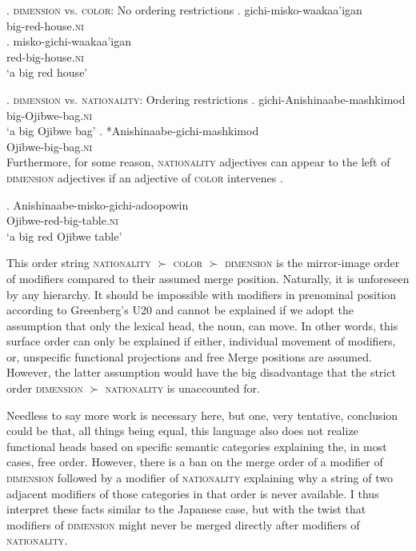 \documentclass [output=book,colorlinks,citecolor=brown]{langscibook}
\begin{document}
\ex. \textsc{dimension} vs. \textsc{color}: No ordering restrictions
\ag. gichi-misko-waakaa’igan\\
big-red-house.\textsc{ni}\\
\bg. misko-gichi-waakaa’igan\\
red-big-house.\textsc{ni}\\
`a big red house’ \null \hfill \citep[161]{rosen:2016:on}

\ex. \textsc{dimension} vs. \textsc{nationality}: Ordering restrictions
\ag. gichi-Anishinaabe-mashkimod\\
big-Ojibwe-bag.\textsc{ni}\\
`a big Ojibwe bag’
\bg. *Anishinaabe-gichi-mashkimod\\
Ojibwe-big-bag.\textsc{ni} \null \hfill \citep[162]{rosen:2016:on}\\

Furthermore, for some reason, \textsc{nationality} adjectives can appear to the left of \textsc{dimension} adjectives if an adjective of \textsc{color} intervenes \citep[162]{rosen:2016:on}.

\exg. Anishinaabe-misko-gichi-adoopowin\\
Ojibwe-red-big-table.\textsc{ni}\\
`a big red Ojibwe table’ \null \hfill \citep[162]{rosen:2016:on}

This order string \textsc{nationality} $\succ$ \textsc{color} $\succ$ \textsc{dimension} is the mirror-image order of modifiers compared to their assumed merge position. Naturally, it is unforeseen by any hierarchy. It should be impossible with modifiers in prenominal position according to Greenberg’s U20 and cannot be explained if we adopt the assumption that only the lexical head, the noun, can move. In other words, this surface order can only be explained if either, individual movement of modifiers, or, unspecific functional projections and free Merge positions are assumed. However, the latter assumption would have the big disadvantage that the strict order \textsc{dimension} $\succ$ \textsc{nationality} is unaccounted for.

Needless to say more work is necessary here, but one, very tentative, conclusion could be that, all things being equal, this language also does not realize functional heads based on specific semantic categories explaining the, in most cases, free order. However, there is a ban on the merge order of a modifier of \textsc{dimension} followed by a modifier of \textsc{nationality}  explaining why a string of two adjacent modifiers of those categories in that order is never available. I thus interpret these facts similar to the Japanese case, but with the twist that modifiers of \textsc{dimension} might never be merged directly after modifiers of \textsc{nationality}.
\end{document}

